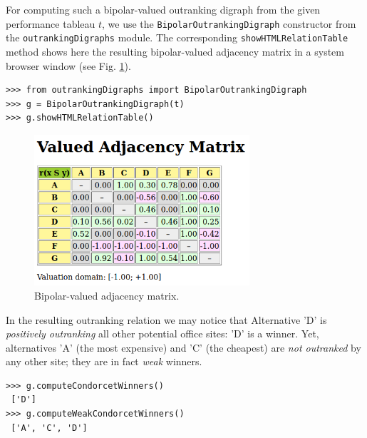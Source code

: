 For computing such a bipolar-valued outranking digraph from the given performance tableau $t$, we use the \texttt{BipolarOutrankingDigraph} constructor from the \texttt{outrankingDigraphs} module. The corresponding \texttt{showHTMLRelationTable} method shows here the resulting bipolar-valued adjacency matrix in a system browser window (see Fig. \ref{fig:6.2}).
\begin{lstlisting}
>>> from outrankingDigraphs import BipolarOutrankingDigraph
>>> g = BipolarOutrankingDigraph(t)
>>> g.showHTMLRelationTable()
\end{lstlisting}
\begin{figure}[h]
\includegraphics[width=8cm]{Figures/officeChoiceOutranking.png}
\caption{Bipolar-valued adjacency matrix.}
\label{fig:6.2}       %
\end{figure}
In the resulting outranking relation we may notice that Alternative 'D' is \emph{positively outranking} all other potential office sites: 'D' is a \Condorcet winner. Yet, alternatives 'A' (the most expensive) and 'C' (the cheapest) are \emph{not outranked} by any other site; they are in fact \emph{weak} \Condorcet winners.
\begin{lstlisting}
>>> g.computeCondorcetWinners()
 ['D']
>>> g.computeWeakCondorcetWinners()
 ['A', 'C', 'D']
\end{lstlisting}

